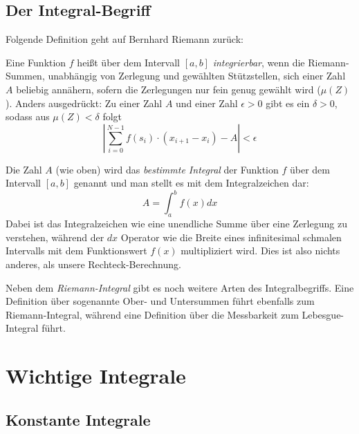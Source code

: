 \subsection{Der Integral-Begriff}

Folgende Definition geht auf Bernhard Riemann zurück:

\begin{definition}
Eine Funktion $f$ heißt über dem Intervall $[a,b]$ \emph{integrierbar}, wenn die Riemann-Summen, unabhängig von Zerlegung und gewählten Stützstellen, sich einer Zahl $A$ beliebig annähern, sofern die Zerlegungen nur fein genug gewählt wird ($\mu(Z)$). Anders ausgedrückt: Zu einer Zahl $A$ und einer Zahl $\epsilon >0$ gibt es ein $\delta >0$, sodass aus $\mu(Z)<\delta$ folgt
\begin{equation}
\left| \sum_{i=0}^{N-1} f(s_i)\cdot (x_{i+1}-x_i) -A \right| < \epsilon
\end{equation}
\end{definition}

\begin{definition}
Die Zahl $A$ (wie oben) wird das \emph{bestimmte Integral} der Funktion $f$ über dem Intervall $[a,b]$ genannt und man stellt es mit dem Integralzeichen dar:
\begin{equation}
A = \int_{a}^{b} f(x) dx
\end{equation}
Dabei ist das Integralzeichen wie eine unendliche Summe über eine Zerlegung zu verstehen, während der $dx$ Operator wie die Breite eines infinitesimal schmalen Intervalls mit dem Funktionswert $f(x)$ multipliziert wird. Dies ist also nichts anderes, als unsere Rechteck-Berechnung.
\end{definition}

Neben dem \emph{Riemann-Integral} gibt es noch weitere Arten des Integralbegriffs. Eine Definition über sogenannte Ober- und Untersummen führt ebenfalls zum Riemann-Integral, während eine Definition über die Messbarkeit zum Lebesgue-Integral führt.

\section{Wichtige Integrale}

\subsection{Konstante Integrale}

